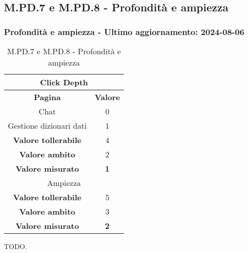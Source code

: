 \subsection{M.PD.7 e M.PD.8 - Profondità e ampiezza}

\subsubsection*{Profondità e ampiezza - Ultimo aggiornamento: 2024-08-06}

\begin{table}[H]
  \centering
  \begin{tabular}{|c|c|}
      \hline
      \multicolumn{2}{|c|}{Click Depth} \\
      \hline
      \textbf{Pagina} & \textbf{Valore} \\
      \hline
      Chat & 0 \\
      \hline 
      Gestione dizionari dati & 1 \\
      \hline
      \textbf{Valore tollerabile} & 4 \\
      \hline
      \textbf{Valore ambito} & 2 \\
      \hline
      \textbf{Valore misurato} & \textbf{1} \\
      \hline
      \multicolumn{2}{|c|}{Ampiezza} \\
      \hline
      \textbf{Valore tollerabile} & 5 \\
      \hline
      \textbf{Valore ambito} & 3 \\
      \hline
      \textbf{Valore misurato} & \textbf{2} \\
      \hline 
  \end{tabular}
  \caption{M.PD.7 e M.PD.8 - Profondità e ampiezza}
\end{table}

\par TODO.